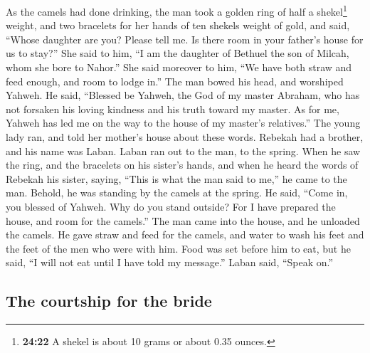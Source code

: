  As the camels had done drinking, the man took a golden
ring of half a shekel\footnote{\textbf{24:22} A shekel is about 10 grams
  or about 0.35 ounces.} weight, and two bracelets for her hands of ten
shekels weight of gold,  and said, ``Whose daughter are
you? Please tell me. Is there room in your father's house for us to
stay?''  She said to him, ``I am the daughter of Bethuel
the son of Milcah, whom she bore to Nahor.''  She said
moreover to him, ``We have both straw and feed enough, and room to lodge
in.''  The man bowed his head, and worshiped Yahweh.
 He said, ``Blessed be Yahweh, the God of my master
Abraham, who has not forsaken his loving kindness and his truth toward
my master. As for me, Yahweh has led me on the way to the house of my
master's relatives.''  The young lady ran, and told her
mother's house about these words.  Rebekah had a brother,
and his name was Laban. Laban ran out to the man, to the spring.
 When he saw the ring, and the bracelets on his sister's
hands, and when he heard the words of Rebekah his sister, saying, ``This
is what the man said to me,'' he came to the man. Behold, he was
standing by the camels at the spring.  He said, ``Come
in, you blessed of Yahweh. Why do you stand outside? For I have prepared
the house, and room for the camels.''  The man came into
the house, and he unloaded the camels. He gave straw and feed for the
camels, and water to wash his feet and the feet of the men who were with
him.  Food was set before him to eat, but he said, ``I
will not eat until I have told my message.'' Laban said, ``Speak on.''

\hypertarget{the-courtship-for-the-bride}{%
\subsection{The courtship for the
bride}\label{the-courtship-for-the-bride}}

